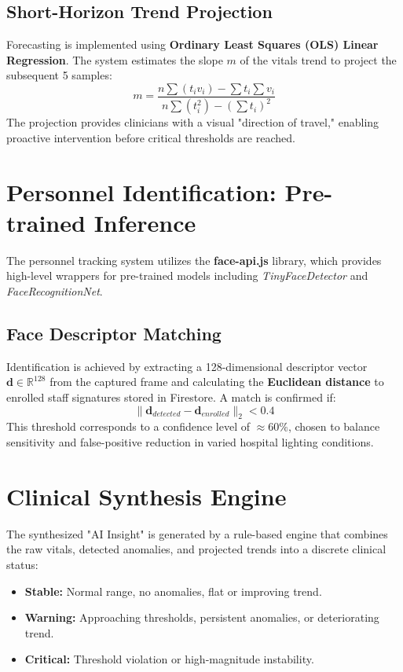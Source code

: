 \subsection{Short-Horizon Trend Projection}
Forecasting is implemented using \textbf{Ordinary Least Squares (OLS) Linear Regression}. The system estimates the slope $m$ of the vitals trend to project the subsequent 5 samples:
\begin{equation}
    m = \frac{n\sum(t_i v_i) - \sum t_i \sum v_i}{n\sum(t_i^2) - (\sum t_i)^2}
    \label{eq:ols_slope}
\end{equation}
The projection provides clinicians with a visual "direction of travel," enabling proactive intervention before critical thresholds are reached.

\section{Personnel Identification: Pre-trained Inference}
The personnel tracking system utilizes the \textbf{face-api.js}\cite{faceapi} library, which provides high-level wrappers for pre-trained models including \textit{TinyFaceDetector} and \textit{FaceRecognitionNet}. 

\subsection{Face Descriptor Matching}
Identification is achieved by extracting a 128-dimensional descriptor vector $\mathbf{d} \in \mathbb{R}^{128}$ from the captured frame and calculating the \textbf{Euclidean distance} to enrolled staff signatures stored in Firestore. A match is confirmed if:
\begin{equation}
    \lVert \mathbf{d}_{detected} - \mathbf{d}_{enrolled} \rVert_2 < 0.4
\end{equation}
This threshold corresponds to a confidence level of $\approx 60\%$, chosen to balance sensitivity and false-positive reduction in varied hospital lighting conditions.

\section{Clinical Synthesis Engine}
The synthesized "AI Insight" is generated by a rule-based engine that combines the raw vitals, detected anomalies, and projected trends into a discrete clinical status:

\begin{itemize}
    \item \textbf{Stable:} Normal range, no anomalies, flat or improving trend.
    \item \textbf{Warning:} Approaching thresholds, persistent anomalies, or deteriorating trend.
    \item \textbf{Critical:} Threshold violation or high-magnitude instability.
\end{itemize}

